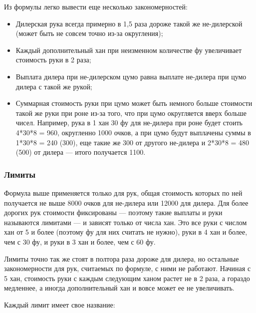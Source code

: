 \begin{additional}
Из формулы легко вывести еще несколько закономерностей:
\begin{itemize}
	\item Дилерская рука всегда примерно в 1,5 раза дороже такой же не-дилерской (может быть не совсем точно из-за округления);
	\item Каждый дополнительный хан при неизменном количестве фу увеличивает стоимость руки в 2 раза;
	\item Выплата дилера при не-дилерском цумо равна выплате не-дилера при цумо дилера с такой же рукой;
	\item Суммарная стоимость руки при цумо может быть немного больше стоимости такой же руки при роне из-за того, что при цумо округляется вверх больше чисел. Например, рука в 1 хан 30 фу для не-дилера при роне будет стоить 4*30*8 = 960, округленно 1000 очков, а при цумо будут выплачены суммы в 1*30*8 = 240 (300), еще такие же 300 от другого не-дилера и 2*30*8 = 480
	(500) от дилера --- итого получается 1100.	
\end{itemize}

\end{additional}

\subsubsection{Лимиты}

Формула выше применяется только для рук, общая стоимость которых по ней получается не выше 8000 очков для не-дилера или 12000 для дилера. Для более дорогих рук стоимости фиксированы --- поэтому такие выплаты и руки называются лимитами --- и зависят только от числа хан. Это все руки с числом хан от 5 и более (поэтому фу для них считать не нужно), руки в 4 хан и более, чем с 30 фу, и руки в 3 хан и более, чем с 60 фу.

Лимиты точно так же стоят в полтора раза дороже для дилера, но остальные закономерности для рук, считаемых по формуле, с ними не работают. Начиная с 5 хан, стоимость руки с каждым следующим ханом растет не в 2 раза, а гораздо медленнее, а иногда дополнительный хан и вовсе может ее не увеличивать.

Каждый лимит имеет свое название:

